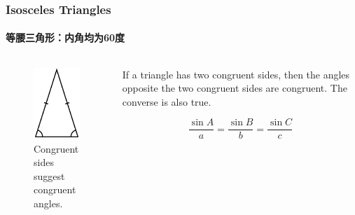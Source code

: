 \documentclass[
	11pt, %
	handout,
]{beamer}
\begin{document}
\begin{frame}
	\frametitle{Isosceles Triangles} %
	\framesubtitle{等腰三角形：内角均为60度}



	\begin{columns}[t] 

		\begin{column}{0.5\textwidth} %
			\begin{figure}
				\includegraphics[width=0.6\linewidth]{220px-Triangle.Isosceles.svg.png}
				\caption{Congruent sides suggest congruent angles.}
			\end{figure}		
		\end{column}
		\begin{column}{0.5\textwidth} %
		\begin{theorem}[两角相等互推两边相等]
			If a triangle has two congruent sides, then the angles opposite
the two congruent sides are congruent. \alert{The converse is also true}.
		\end{theorem}
		\pause
		\begin{theorem}
			\begin{equation*}
				\frac{\sin A}{a}=\frac{\sin B}{b}=\frac{\sin C}{c}
			\end{equation*}
		\end{theorem}
		\end{column}
	\end{columns}
\end{frame}
\end{document}
